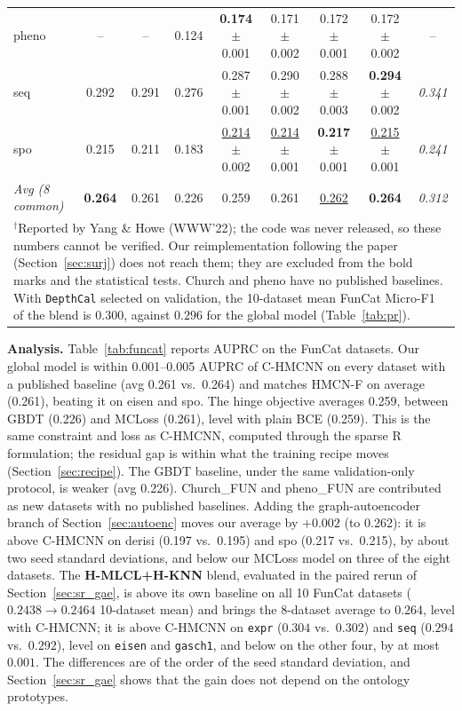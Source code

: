 \documentclass[preprint,12pt]{elsarticle}
\begin{document}
\begin{table}[htbp]
{\begin{tabular}{lcccccccc}
pheno     & -- & -- & 0.124 & \textbf{0.174} $\pm$ 0.001 & 0.171 $\pm$ 0.002 & 0.172 $\pm$ 0.001 & 0.172 $\pm$ 0.002 & -- \\
seq       & 0.292 & 0.291 & 0.276 & 0.287 $\pm$ 0.001 & 0.290 $\pm$ 0.002 & 0.288 $\pm$ 0.003 & \textbf{0.294} $\pm$ 0.002 & \textit{0.341} \\
spo       & 0.215 & 0.211 & 0.183 & \underline{0.214} $\pm$ 0.002 & \underline{0.214} $\pm$ 0.001 & \textbf{0.217} $\pm$ 0.001 & \underline{0.215} $\pm$ 0.001 & \textit{0.241} \\
\midrule
\textit{Avg (8 common)} & \textbf{0.264} & 0.261 & 0.226 & 0.259 & 0.261 & \underline{0.262} & \textbf{0.264} & \textit{0.312} \\
\bottomrule
\multicolumn{9}{p{0.97\textwidth}}{\small $^\dagger$Reported by Yang \& Howe (WWW'22);
the code was never released, so these numbers cannot be verified.  Our
reimplementation following the paper (Section~\ref{sec:surj}) does not
reach them; they are excluded from the bold marks and the statistical tests.
Church and pheno have no published baselines. With \texttt{DepthCal} selected on validation, the 10-dataset mean FunCat Micro-F1 of the blend is $0.300$, against $0.296$ for the global model (Table~\ref{tab:pr}).} \\
\end{tabular}
}
\end{table}

\textbf{Analysis.} Table~\ref{tab:funcat} reports AUPRC on the FunCat
datasets.  Our global model is within 0.001--0.005 AUPRC of C-HMCNN on
every dataset with a published baseline (avg 0.261 vs.\ 0.264) and matches
HMCN-F on average
(0.261), beating it on eisen and spo.  The hinge objective averages
0.259, between GBDT (0.226) and MCLoss (0.261), level with plain BCE
(0.259).
This is the same constraint and
loss as C-HMCNN, computed through the sparse R formulation; the
residual gap is within what the training recipe moves
(Section~\ref{sec:recipe}).  The GBDT baseline, under the same
validation-only protocol, is weaker (avg 0.226).
Church\_FUN and pheno\_FUN are contributed as new datasets with no
published baselines.  Adding the graph-autoencoder branch of
Section~\ref{sec:autoenc} moves our average by $+0.002$ (to 0.262): it is
above C-HMCNN on derisi (0.197 vs.\ 0.195) and spo (0.217 vs.\ 0.215), by
about two seed standard deviations, and below our MCLoss model on three of
the eight datasets. The
\textbf{H-MLCL+H-KNN} blend, evaluated in the paired rerun of
Section~\ref{sec:sr_gae}, is above its own baseline on all 10 FunCat
datasets ($0.2438 \to 0.2464$ 10-dataset mean) and brings the 8-dataset
average to 0.264, level with C-HMCNN; it is above C-HMCNN on \texttt{expr}
($0.304$ vs.\ $0.302$) and \texttt{seq} ($0.294$ vs.\ $0.292$), level on
\texttt{eisen} and \texttt{gasch1}, and below on the other four, by at most
$0.001$. The differences are of the order of the seed standard deviation,
and Section~\ref{sec:sr_gae} shows that the gain does not depend on the
ontology prototypes.
\end{document}
